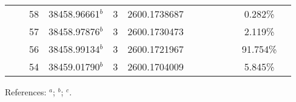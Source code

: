 \begin{table*}
\begin{center}
{\begin{tabular}{:l;l;c;l;c;l;c;l;l;c;c;c;c}
\rowstyle{\itshape}               &        & 58        & 38458.96661$^{b}$                & 3 &  2600.1738687      &      & $                                        $ & $                                        $ & $      $ &              & 0.282\%   & $          $\\
\rowstyle{\itshape}               &        & 57        & 38458.97876$^{b}$                & 3 &  2600.1730473      &      & $                                        $ & $                                        $ & $      $ &              & 2.119\%   & $          $\\
\rowstyle{\itshape}               &        & 56        & 38458.99134$^{b}$                & 3 &  2600.1721967      &      & $                                        $ & $                                        $ & $      $ &              & 91.754\%  & $          $\\
\rowstyle{\itshape}               &        & 54        & 38459.01790$^{b}$                & 3 &  2600.1704009      &      & $                                        $ & $                                        $ & $      $ &              & 5.845\%   & $          $\\
\hline
\end{tabular}
}
{\footnotesize References:
$^{a}$\citet{Nave:2012:1570};
$^{b}$\citet{Porsev:2009:032519};
$^{c}$\citet{Aldenius:2009:014008}.}
\end{center}
\end{table*}
